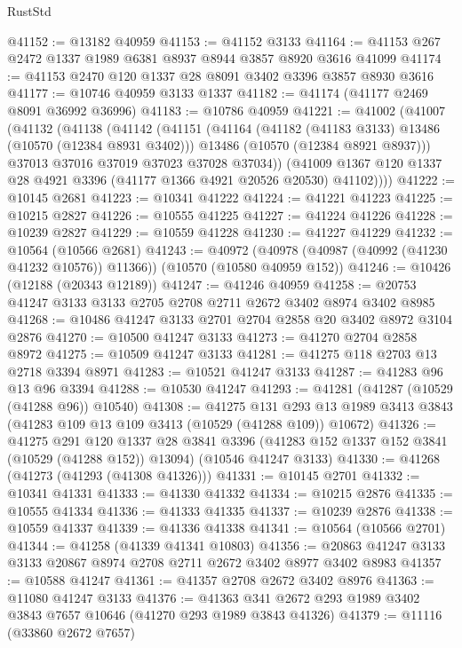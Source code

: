 \begin{lexlean}{RustStd}
\begin{coremodule}
@41152 := @13182 @40959
@41153 := @41152 @3133
@41164 := @41153 @267 @2472 @1337 @1989 @6381 @8937 @8944 @3857 @8920 @3616 @41099
@41174 := @41153 @2470 @120 @1337 @28 @8091 @3402 @3396 @3857 @8930 @3616
@41177 := @10746 @40959 @3133 @1337
@41182 := @41174 (@41177 @2469 @8091 @36992 @36996)
@41183 := @10786 @40959
@41221 := @41002
    (@41007
      (@41132
        (@41138
          (@41142
            (@41151
              (@41164
                (@41182 (@41183 @3133) @13486 (@10570 (@12384 @8931 @3402)))
                @13486
                (@10570 (@12384 @8921 @8937)))
              @37013
              @37016
              @37019
              @37023
              @37028
              @37034))
          (@41009 @1367 @120 @1337 @28 @4921 @3396 (@41177 @1366 @4921 @20526 @20530) @41102))))
@41222 := @10145 @2681
@41223 := @10341 @41222
@41224 := @41221 @41223
@41225 := @10215 @2827
@41226 := @10555 @41225
@41227 := @41224 @41226
@41228 := @10239 @2827
@41229 := @10559 @41228
@41230 := @41227 @41229
@41232 := @10564 (@10566 @2681)
@41243 := @40972
    (@40978 (@40987 (@40992 (@41230 @41232 @10576)) @11366))
    (@10570 (@10580 @40959 @152))
@41246 := @10426 (@12188 (@20343 @12189))
@41247 := @41246 @40959
@41258 := @20753 @41247 @3133 @3133 @2705 @2708 @2711 @2672 @3402 @8974 @3402 @8985
@41268 := @10486 @41247 @3133 @2701 @2704 @2858 @20 @3402 @8972 @3104 @2876
@41270 := @10500 @41247 @3133
@41273 := @41270 @2704 @2858 @8972
@41275 := @10509 @41247 @3133
@41281 := @41275 @118 @2703 @13 @2718 @3394 @8971
@41283 := @10521 @41247 @3133
@41287 := @41283 @96 @13 @96 @3394
@41288 := @10530 @41247
@41293 := @41281 (@41287 (@10529 (@41288 @96)) @10540)
@41308 := @41275
    @131
    @293
    @13
    @1989
    @3413
    @3843
    (@41283 @109 @13 @109 @3413 (@10529 (@41288 @109)) @10672)
@41326 := @41275
    @291
    @120
    @1337
    @28
    @3841
    @3396
    (@41283 @152 @1337 @152 @3841 (@10529 (@41288 @152)) @13094)
    (@10546 @41247 @3133)
@41330 := @41268 (@41273 (@41293 (@41308 @41326)))
@41331 := @10145 @2701
@41332 := @10341 @41331
@41333 := @41330 @41332
@41334 := @10215 @2876
@41335 := @10555 @41334
@41336 := @41333 @41335
@41337 := @10239 @2876
@41338 := @10559 @41337
@41339 := @41336 @41338
@41341 := @10564 (@10566 @2701)
@41344 := @41258 (@41339 @41341 @10803)
@41356 := @20863 @41247 @3133 @3133 @20867 @8974 @2708 @2711 @2672 @3402 @8977 @3402 @8983
@41357 := @10588 @41247
@41361 := @41357 @2708 @2672 @3402 @8976
@41363 := @11080 @41247 @3133
@41376 := @41363 @341 @2672 @293 @1989 @3402 @3843 @7657 @10646 (@41270 @293 @1989 @3843 @41326)
@41379 := @11116 (@33860 @2672 @7657)

\end{coremodule}
\end{lexlean}
